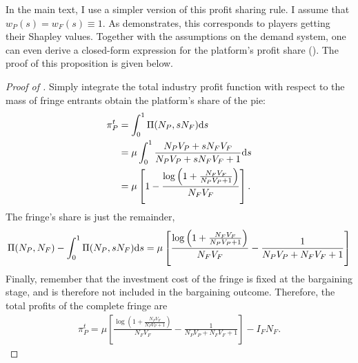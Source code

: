 In the main text, I use a simpler version of this profit sharing rule.
I assume that $w_P(s) = w_F(s) \equiv 1$.
As  demonstrates, this corresponds to players getting their Shapley values.
Together with the assumptions on the demand system, one can even derive a closed-form expression for the platform's profit share ().
The proof of this proposition is given below.
\begin{proof}[Proof of ]
    Simply integrate the total industry profit function with respect to the mass of fringe entrants obtain the platform's share of the pie:
    \begin{align*}
        \pi^t_P &= \int_0^1 \Pi(N_P, sN_F) \mathrm{d}s \\
        &= \mu \int_0^1 \frac{N_P V_P + s N_F V_F}{N_P V_P + s N_F V_F + 1} \mathrm{d}s \\
        &= \mu \left[ 1 - \frac{\log \left(1 + \frac{N_F V_F}{N_P V_P + 1} \right)}{N_F V_F} \right].
    \end{align*}
    The fringe's share is just the remainder,
    \begin{align*}
        \Pi(N_P, N_F) - \int_0^1 \Pi(N_P, sN_F) \mathrm{d}s = \mu \left[ \frac{\log \left( 1 + \frac{N_F V_F}{N_P V_P + 1} \right)}{N_F V_F} - \frac{1}{N_P V_P + N_F V_F + 1} \right]
    \end{align*}
    Finally, remember that the investment cost of the fringe is fixed at the bargaining stage, and is therefore not included in the bargaining outcome.
    Therefore, the total profits of the complete fringe are
    \begin{align*}
        \pi^t_P = \mu \left[ \frac{\log \left( 1 + \frac{N_F V_F}{N_P V_P + 1} \right)}{N_F V_F} - \frac{1}{N_P V_P + N_F V_F + 1} \right] - I_F N_F.
    \end{align*}
\end{proof}

